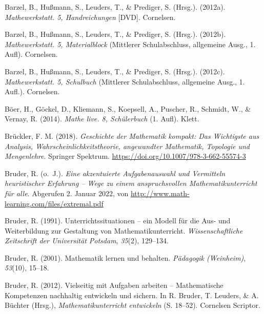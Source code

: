 \documentclass[
]{scrbook}
\newlength{\cslhangindent}
\newlength{\cslentryspacingunit} %
\newenvironment{CSLReferences}[2] %
 {%
  \setlength{\parindent}{0pt}
  \ifodd #1
  \let\oldpar\par
  \def\par{\hangindent=\cslhangindent\oldpar}
  \fi
  \setlength{\parskip}{#2\cslentryspacingunit}
 }%
 {}
\theoremstyle{definition}
\theoremstyle{definition}
\theoremstyle{definition}
\theoremstyle{definition}
\theoremstyle{remark}
\begin{document}
\hypertarget{refs}{}
\begin{CSLReferences}{1}{0}
\leavevmode{}%
Barzel, B., Hußmann, S., Leuders, T., \& Prediger, S. (Hrsg.). (2012a). \emph{Mathewerkstatt. 5, {Handreichungen}} {[}DVD{]}. Cornelsen.

\leavevmode{}%
Barzel, B., Hußmann, S., Leuders, T., \& Prediger, S. (Hrsg.). (2012b). \emph{Mathewerkstatt. 5, {Materialblock}} (Mittlerer Schulabschluss, allgemeine Ausg., 1. Aufl). Cornelsen.

\leavevmode{}%
Barzel, B., Hußmann, S., Leuders, T., \& Prediger, S. (Hrsg.). (2012c). \emph{Mathewerkstatt. 5, {Schulbuch}} (Mittlerer Schulabschluss, allgemeine Ausg., 1. Aufl.). Cornelsen.

\leavevmode{}%
Böer, H., Göckel, D., Kliemann, S., Koepsell, A., Puscher, R., Schmidt, W., \& Vernay, R. (2014). \emph{Mathe live. 8, {Schülerbuch}} (1. Aufl). Klett.

\leavevmode{}%
Brückler, F. M. (2018). \emph{Geschichte der {Mathematik} kompakt: {Das} {Wichtigste} aus {Analysis}, {Wahrscheinlichkeitstheorie}, angewandter {Mathematik}, {Topologie} und {Mengenlehre}}. Springer Spektrum. \url{https://doi.org/10.1007/978-3-662-55574-3}

\leavevmode{}%
Bruder, R. (o.~J.). \emph{Eine akzentuierte {Aufgabenauswahl} und {Vermitteln} heuristischer {Erfahrung} -- {Wege} zu einem anspruchsvollen {Mathematikunterricht} für alle}. Abgerufen 2. Januar 2022, von \url{http://www.math-learning.com/files/extremal.pdf}

\leavevmode{}%
Bruder, R. (1991). Unterrichtssituationen -- ein {Modell} für die {Aus}- und {Weiterbildung} zur {Gestaltung} von {Mathematikunterricht}. \emph{Wissenschaftliche Zeitschrift der Universität Potsdam}, \emph{35}(2), 129--134.

\leavevmode{}%
Bruder, R. (2001). Mathematik lernen und behalten. \emph{Pädagogik (Weinheim)}, \emph{53}(10), 15--18.

\leavevmode{}%
Bruder, R. (2012). Vielseitig mit {Aufgaben} arbeiten -- {Mathematische} {Kompetenzen} nachhaltig entwickeln und sichern. In R. Bruder, T. Leuders, \& A. Büchter (Hrsg.), \emph{Mathematikunterricht entwickeln} (S. 18--52). Cornelsen Scriptor.


\end{CSLReferences}
\end{document}
